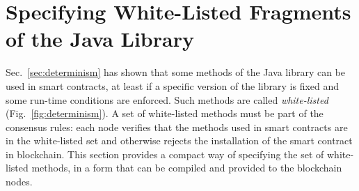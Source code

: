 \section{Specifying White-Listed Fragments of the Java Library}\label{sec:white_listing}

Sec.~\ref{sec:determinism} has shown that some methods of the Java library can be used
in smart contracts, at least if a specific version of the library is fixed and some
run-time conditions are enforced. Such methods are called \emph{white-listed}
(Fig.~\ref{fig:determinism}). A set of white-listed methods must be part of the
consensus rules: each node verifies that the methods used in smart contracts are
in the white-listed set and otherwise rejects the installation of the smart contract
in blockchain. This section provides a compact way of specifying the set of white-listed methods,
in a form that can be compiled and provided to the blockchain nodes.
